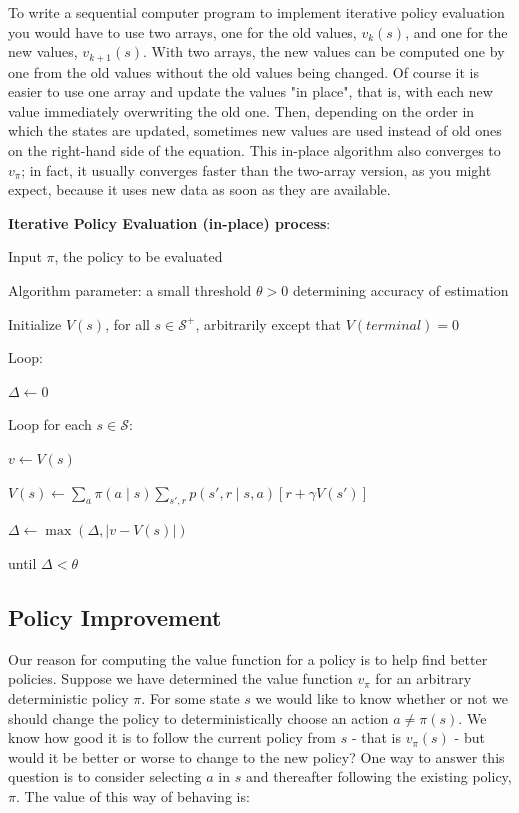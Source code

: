 \documentclass{article}
\begin{document}
To write a sequential computer program to implement iterative policy evaluation you would have to use two arrays, one for the old values, \(v_{k}(s)\), 
and one for the new values, \(v_{k + 1}(s)\). With two arrays, the new values can be computed one by one from the old values without the old values being changed. 
Of course it is easier to use one array and update the values "in place", that is, with each new value immediately overwriting the old one. 
Then, depending on the order in which the states are updated, sometimes new values are used instead of old ones on the right-hand side of the equation. 
This in-place algorithm also converges to \(v_{\pi}\); in fact, it usually converges faster than the two-array version, as you might expect, because it uses new data as soon as they are available.

\textbf{Iterative Policy Evaluation (in-place) process}:

Input \(\pi\), the policy to be evaluated

Algorithm parameter: a small threshold \(\theta > 0\) determining accuracy of estimation

Initialize \(V(s)\), for all \(s \in \mathcal{S}^+\), arbitrarily except that \(V(terminal) = 0\)

Loop:

\hspace{.5cm} \(\Delta \leftarrow 0\)

\hspace{.5cm} Loop for each \(s \in \mathcal{S}\):

\hspace{1cm} \(v \leftarrow V(s)\)

\hspace{1cm} \(V(s) \leftarrow \sum_a \pi(a \mid s) \sum_{s', r} p(s', r \mid s, a) [r + \gamma V(s')]\)

\hspace{1cm} \(\Delta \leftarrow \max(\Delta, \vert v -  V(s) \vert)\)

until \(\Delta < \theta\)

\subsection{Policy Improvement}

Our reason for computing the value function for a policy is to help find better policies. 
Suppose we have determined the value function \(v_{\pi}\) for an arbitrary deterministic policy \(\pi\). 
For some state \(s\) we would like to know whether or not we should change the policy to deterministically choose an action \(a \ne \pi(s)\). 
We know how good it is to follow the current policy from \(s\) - that is \(v_{\pi}(s)\) - but would it be better or worse to change to the new policy? 
One way to answer this question is to consider selecting \(a\) in \(s\) and thereafter following the existing policy, \(\pi\). 
The value of this way of behaving is:
\end{document}
